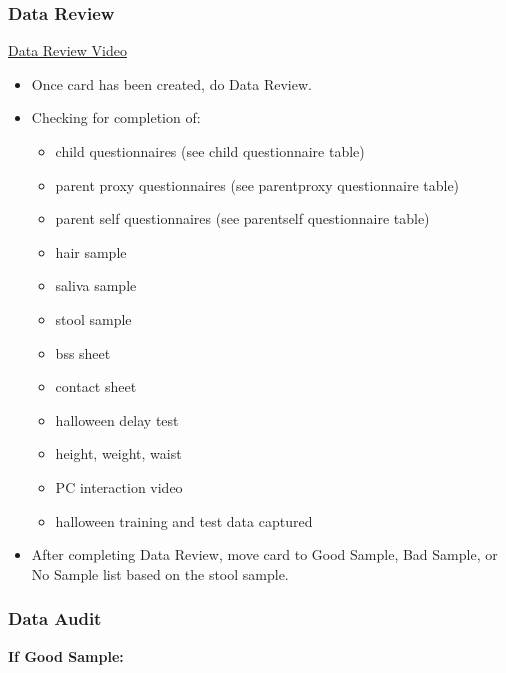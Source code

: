 \documentclass[]{book}
\providecommand{\tightlist}{%
  \setlength{\itemsep}{0pt}\setlength{\parskip}{0pt}}
\begin{document}
\hypertarget{data-review}{%
\subsubsection{Data Review}\label{data-review}}

\href{https://youtu.be/z_mQGyguaEY}{Data Review Video}

\begin{itemize}
\tightlist
\item
  Once card has been created, do Data Review.
\item
  Checking for completion of:

  \begin{itemize}
  \tightlist
  \item
    child questionnaires (see child questionnaire table)
  \item
    parent proxy questionnaires (see parentproxy questionnaire table)
  \item
    parent self questionnaires (see parentself questionnaire table)
  \item
    hair sample
  \item
    saliva sample
  \item
    stool sample
  \item
    bss sheet
  \item
    contact sheet
  \item
    halloween delay test
  \item
    height, weight, waist
  \item
    PC interaction video
  \item
    halloween training and test data captured
  \end{itemize}
\item
  After completing Data Review, move card to Good Sample, Bad Sample, or No Sample list based on the stool sample.
\end{itemize}

\hypertarget{data-audit}{%
\subsubsection{Data Audit}\label{data-audit}}

\textbf{If Good Sample:}
\end{document}

